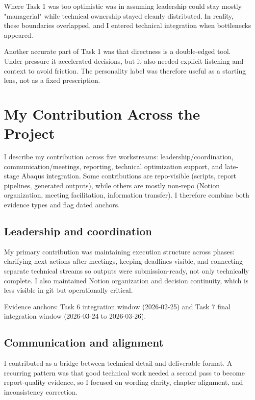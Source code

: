 \noindent Where Task 1 was too optimistic was in assuming leadership could stay mostly "managerial" while technical ownership stayed cleanly distributed. In reality, these boundaries overlapped, and I entered technical integration when bottlenecks appeared.


\noindent Another accurate part of Task 1 was that directness is a double-edged tool. Under pressure it accelerated decisions, but it also needed explicit listening and context to avoid friction. The personality label was therefore useful as a starting lens, not as a fixed prescription.


\chapter{My Contribution Across the Project}


\noindent I describe my contribution across five workstreams: leadership/coordination, communication/meetings, reporting, technical optimization support, and late-stage Abaqus integration. Some contributions are repo-visible (scripts, report pipelines, generated outputs), while others are mostly non-repo (Notion organization, meeting facilitation, information transfer). I therefore combine both evidence types and flag dated anchors.


\section{Leadership and coordination}


\noindent My primary contribution was maintaining execution structure across phases: clarifying next actions after meetings, keeping deadlines visible, and connecting separate technical streams so outputs were submission-ready, not only technically complete. I also maintained Notion organization and decision continuity, which is less visible in git but operationally critical.

\noindent Evidence anchors: Task 6 integration window (2026-02-25) and Task 7 final integration window (2026-03-24 to 2026-03-26).


\section{Communication and alignment}


\noindent I contributed as a bridge between technical detail and deliverable format. A recurring pattern was that good technical work needed a second pass to become report-quality evidence, so I focused on wording clarity, chapter alignment, and inconsistency correction.


